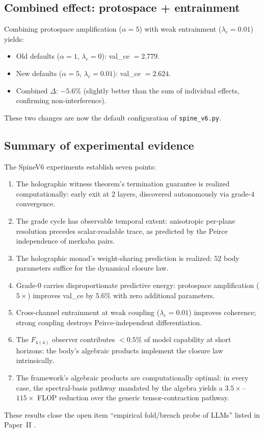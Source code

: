 \documentclass[11pt,a4paper]{article}
\theoremstyle{plain}
\theoremstyle{definition}
\theoremstyle{remark}
\numberwithin{equation}{section}
\begin{document}
\subsection{Combined effect: protospace + entrainment}

Combining protospace amplification ($\alpha = 5$) with weak
entrainment ($\lambda_e = 0.01$) yields:
\begin{itemize}[nosep]
  \item Old defaults ($\alpha = 1$, $\lambda_e = 0$): val\_ce $= 2.779$.
  \item New defaults ($\alpha = 5$, $\lambda_e = 0.01$): val\_ce $= 2.624$.
  \item Combined $\Delta$: $-5.6\%$ (slightly better than the sum of
    individual effects, confirming non-interference).
\end{itemize}
These two changes are now the default configuration of
\texttt{spine\_v6.py}.

\subsection{Summary of experimental evidence}

The SpineV6 experiments establish seven points:
\begin{enumerate}[label=(\arabic*), nosep]
  \item The holographic witness theorem's termination guarantee is
    realized computationally: early exit at $2$ layers, discovered
    autonomously via grade-$4$ convergence.
  \item The grade cycle has observable temporal extent: anisotropic
    per-plane resolution precedes scalar-readable trace, as
    predicted by the Peirce independence of merkaba pairs.
  \item The holographic monad's weight-sharing prediction is
    realized: $52$ body parameters suffice for the dynamical
    closure law.
  \item Grade-$0$ carries disproportionate predictive energy:
    protospace amplification ($5\times$) improves val\_ce by
    $5.6\%$ with zero additional parameters.
  \item Cross-channel entrainment at weak coupling ($\lambda_e =
    0.01$) improves coherence; strong coupling destroys
    Peirce-independent differentiation.
  \item The $F_{4(4)}$ observer contributes $< 0.5\%$ of model
    capability at short horizons: the body's algebraic products
    implement the closure law intrinsically.
  \item The framework's algebraic products are computationally
    optimal: in every case, the spectral-basis pathway mandated
    by the algebra yields a $3.5\times$--$115\times$ FLOP
    reduction over the generic tensor-contraction pathway.
\end{enumerate}
These results close the open item ``empirical fold/breach probe of
LLMs'' listed in Paper~II \cite[\S 13]{paper-II-proof}.
\end{document}
